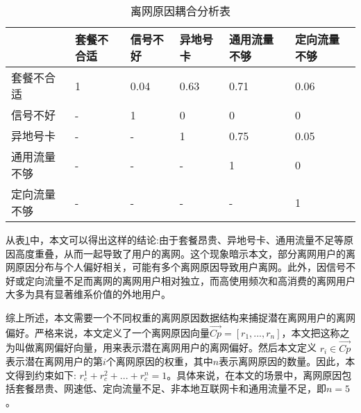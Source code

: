 \begin{table}[htb]
	\centering
	\caption{离网原因耦合分析表}
	\label{Table:Coupled-Analysis}
	\begin{tabular}{llllll}
		\toprule
	\ & 套餐不合适 & 信号不好 & 异地号卡 & 通用流量不够 & 定向流量不够 \\
		\midrule 
		\midrule
		套餐不合适 & 1 & 0.04  & 0.63 & 0.71 & 0.06 \\
		信号不好 & - & 1 & 0 & 0 & 0 \\
		异地号卡 & - & - & 1 & 0.75 & 0.05 \\
		通用流量不够 & - & - & - & 1 & 0 \\
		定向流量不够 & - & -  & - & - & 1 \\
		\midrule 
		\bottomrule	
	\end{tabular}
\end{table}


从表\ref{Table:Coupled-Analysis}中，本文可以得出这样的结论:由于套餐昂贵、异地号卡、通用流量不足等原因高度重叠，从而一起导致了用户的离网。这个现象暗示本文，部分离网用户的离网原因分布与个人偏好相关，可能有多个离网原因导致用户离网。此外，因信号不好或定向流量不足而离网的离网用户相对独立，而高使用频次和高消费的离网用户大多为具有显著维系价值的外地用户。\par
综上所述，本文需要一个不同权重的离网原因数据结构来捕捉潜在离网用户的离网偏好。严格来说，本文定义了一个离网原因向量$\overrightarrow{C p} = [r_{1}, ..., r_{n}]$，本文把这称之为叫做离网偏好向量，用来表示潜在离网用户的离网偏好。然后本文定义 $r_{i} \in \overrightarrow{C p}$ 表示潜在离网用户的第$i$个离网原因的权重，其中$n$表示离网原因的数量。因此，本文得到约束如下: $r^{1}_{c} + r^{2}_{c} + ... +r^{n}_{c} = 1$。具体来说，在本文的场景中，离网原因包括套餐昂贵、网速低、定向流量不足、非本地互联网卡和通用流量不足，即$n = 5$。


